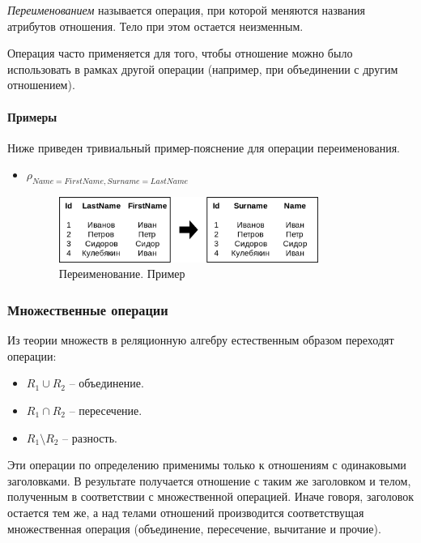 \begin{definition}
	\textit{Переименованием} называется операция, при которой меняются названия
	атрибутов отношения. Тело при этом остается неизменным.
\end{definition}

Операция часто применяется для того, чтобы отношение можно было использовать в рамках другой операции (например, при объединении с другим отношением).

\paragraph{Примеры}
Ниже приведен тривиальный пример-пояснение для операции переименования.

\begin{itemize}
	\item $\rho_{Name=FirstName, Surname=LastName}$
	      \begin{figure}[H]
		      \centering

		      \includegraphics[width=0.8\textwidth]{../assets/kgeorgiy/relalgebra/Primitive_Rename_2.svg.png}
		      \caption{Переименование. Пример}
		      \label{ren-ex}
	      \end{figure}
\end{itemize}

\subsubsection{Множественные операции}

Из теории множеств в реляционную алгебру естественным образом переходят операции:
\begin{itemize}
	\item $R_1 \cup R_2$ -- объединение.
	\item $R_1 \cap R_2$ -- пересечение.
	\item $R_1 \setminus R_2$ -- разность.
\end{itemize}

Эти операции по определению применимы только к отношениям с одинаковыми заголовками. В результате получается отношение с таким же заголовком и телом, полученным в соответствии с множественной операцией. Иначе говоря, заголовок остается тем же, а над телами отношений производится соответствущая множественная операция (объединение, пересечение, вычитание и прочие).


